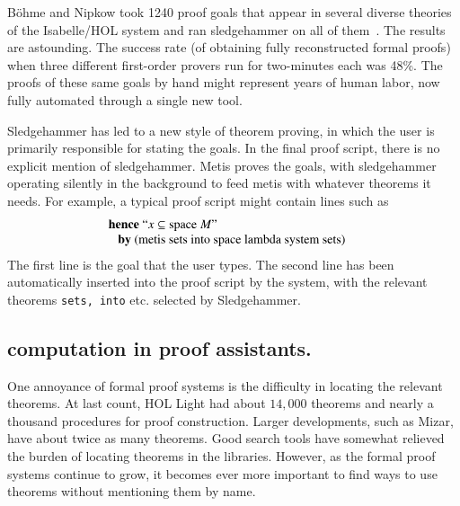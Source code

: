 \documentclass{llncs}
\begin{document}

B\"ohme and Nipkow 
took 1240 proof goals that appear in several diverse theories of the
Isabelle/HOL system and ran sledgehammer on all of
them~\cite{Boehme-Nipkow-IJCAR10}. The results are astounding. The
success rate (of obtaining fully reconstructed formal proofs) when
three different first-order provers run for two-minutes each was 48\%.
The proofs of these same goals by hand might represent years of human
labor, now fully automated through a single new tool.

Sledgehammer has led to a new style of theorem proving, in which the
user is primarily responsible for stating the goals.  In the final
proof script, there is no explicit mention of sledgehammer.  Metis
proves the goals, with sledgehammer operating silently in the
background to feed metis with whatever theorems it needs.  For
example, a typical proof script might contain lines such as
\cite{Paar}
\[
\begin{array}{ll}
\text{{\bf hence} ``$x \subseteq \text{space}~M$''}\\
\text{~~~{\bf by} (metis sets into space lambda system sets)}&
\end{array}
\]
The first line is the goal that the user types. The second line has been
automatically inserted into the proof script by the system, with the relevant
theorems {\tt sets, into} etc. selected by Sledgehammer.



\subsection{computation in proof assistants.}

One annoyance of formal proof systems is the difficulty in locating
the relevant theorems.  At last count, HOL Light had about $14,000$
theorems and nearly a thousand procedures for proof construction.
Larger developments, such as Mizar, have about twice as many theorems.
Good search tools have somewhat relieved the burden of locating
theorems in the libraries.  However, as the formal proof systems
continue to grow, it becomes ever more important to find ways to use
theorems without mentioning them by name.

\end{document}
